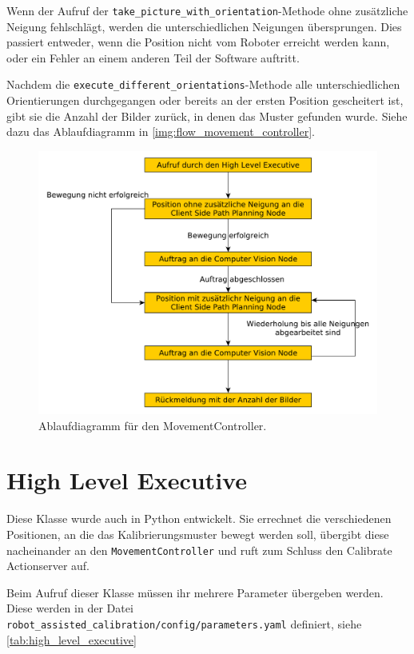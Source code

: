 Wenn der Aufruf der \texttt{take\_picture\_with\_orientation}-Methode ohne zusätzliche Neigung fehlschlägt, werden die unterschiedlichen Neigungen übersprungen. Dies passiert entweder, wenn die Position nicht vom Roboter erreicht werden kann, oder ein Fehler an einem anderen Teil der Software auftritt.

Nachdem die \texttt{execute\_different\_orientations}-Methode alle unterschiedlichen Orientierungen durchgegangen oder bereits an der ersten Position gescheitert ist, gibt sie die Anzahl der Bilder zurück, in denen das Muster gefunden wurde. Siehe dazu das Ablaufdiagramm in \autoref{img:flow_movement_controller}.
\begin{figure}[h]
\centering
\includegraphics[width=\textwidth]{images/movement_controller}
\caption{Ablaufdiagramm für den MovementController.}\label{img:movement_controller}
\end{figure}

\section{High Level Executive} %
\label{sec:calibrationcontroller_impl}
Diese Klasse wurde auch in Python entwickelt. Sie errechnet die verschiedenen Positionen, an die das Kalibrierungsmuster bewegt werden soll, übergibt diese nacheinander an den \texttt{MovementController} und ruft zum Schluss den Calibrate Actionserver auf.

Beim Aufruf dieser Klasse müssen ihr mehrere Parameter übergeben werden. Diese werden in der Datei \texttt{robot\_assisted\_calibration/config/parameters.yaml} definiert, siehe \autoref{tab:high_level_executive}

